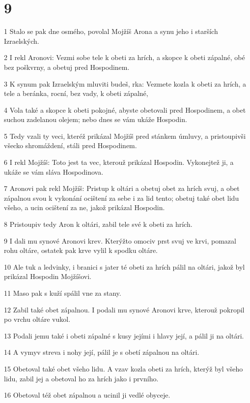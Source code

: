 \chapter{9}

\par 1 Stalo se pak dne osmého, povolal Mojžíš Arona a synu jeho i starších Izraelských.
\par 2 I rekl Aronovi: Vezmi sobe tele k obeti za hrích, a skopce k obeti zápalné, obé bez poškvrny, a obetuj pred Hospodinem.
\par 3 K synum pak Izraelským mluviti budeš, rka: Vezmete kozla k obeti za hrích, a tele a beránka, rocní, bez vady, k obeti zápalné,
\par 4 Vola také a skopce k obeti pokojné, abyste obetovali pred Hospodinem, a obet suchou zadelanou olejem; nebo dnes se vám ukáže Hospodin.
\par 5 Tedy vzali ty veci, kteréž prikázal Mojžíš pred stánkem úmluvy, a pristoupivši všecko shromáždení, stáli pred Hospodinem.
\par 6 I rekl Mojžíš: Toto jest ta vec, kterouž prikázal Hospodin. Vykonejtež ji, a ukáže se vám sláva Hospodinova.
\par 7 Aronovi pak rekl Mojžíš: Pristup k oltári a obetuj obet za hrích svuj, a obet zápalnou svou k vykonání ocištení za sebe i za lid tento; obetuj také obet lidu všeho, a ucin ocištení za ne, jakož prikázal Hospodin.
\par 8 Pristoupiv tedy Aron k oltári, zabil tele své k obeti za hrích.
\par 9 I dali mu synové Aronovi krev. Kterýžto omociv prst svuj ve krvi, pomazal rohu oltáre, ostatek pak krve vylil k spodku oltáre.
\par 10 Ale tuk a ledvinky, i branici s jater té obeti za hrích pálil na oltári, jakož byl prikázal Hospodin Mojžíšovi.
\par 11 Maso pak s kuží spálil vne za stany.
\par 12 Zabil také obet zápalnou. I podali mu synové Aronovi krve, kterouž pokropil po vrchu oltáre vukol.
\par 13 Podali jemu také i obeti zápalné s kusy jejími i hlavy její, a pálil ji na oltári.
\par 14 A vymyv streva i nohy její, pálil je s obetí zápalnou na oltári.
\par 15 Obetoval také obet všeho lidu. A vzav kozla obeti za hrích, kterýž byl všeho lidu, zabil jej a obetoval ho za hrích jako i prvního.
\par 16 Obetoval též obet zápalnou a ucinil ji vedlé obyceje.
